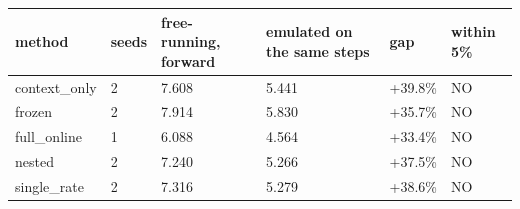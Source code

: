 \begin{tabular}{llllll}
\hline
method & seeds & free-running, forward & emulated on the same steps & gap & within 5\% \\
\hline
context\_only & 2 & 7.608 & 5.441 & +39.8\% & NO \\
frozen & 2 & 7.914 & 5.830 & +35.7\% & NO \\
full\_online & 1 & 6.088 & 4.564 & +33.4\% & NO \\
nested & 2 & 7.240 & 5.266 & +37.5\% & NO \\
single\_rate & 2 & 7.316 & 5.279 & +38.6\% & NO \\
\hline
\end{tabular}
